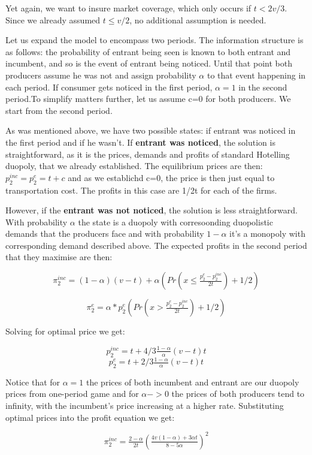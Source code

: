 \documentclass{article}
\begin{document}
Yet again, we want to insure market coverage, which only occurs if $t<2v/3$. Since we already assumed $t \leq v/2$, no additional assumption is needed.

Let us expand the model to encompass two periods. The information structure is as follows: the probability of entrant being seen is known to both entrant and incumbent, and so is the event of entrant being noticed. Until that point both producers assume he was not and assign probability $\alpha$ to that event happening in each period. If consumer gets noticed in the first period, $\alpha =1$ in the second period.To simplify matters further, let us assume c=0 for both producers. We start from the second period.

As was mentioned above, we have two possible states: if entrant was noticed in the first period and if he wasn't. If \textbf{entrant was noticed}, the solution is straightforward, as it is the prices, demands and profits of standard Hotelling duopoly, that we already established. The equilibrium prices are then: $p^{inc}_2 = p^{e}_2 = t+c$ and as we establichd c=0, the price is then just equal to transportation cost. The profits in this case are 1/2t for each of the firms.

However, if the \textbf{entrant was not noticed}, the solution is less straightforward. With probability $\alpha$ the state is a duopoly with corresoonding duopolistic demands that the producers face and with probability $1- \alpha$ it's a monopoly with corresponding demand described above. 
The expected profits in the second period that they maximise are then:

$$ \pi^{inc}_2 = (1-\alpha)(v-t) +  \alpha(Pr(x \leq \tfrac{p^{e}_2 - p^{inc}_2}{2t}) + 1/2)$$

$$ \pi^{e}_2 = \alpha *p_2^{e}(Pr(x > \tfrac{p^{e}_2 - p^{inc}_2}{2t}) + 1/2)
$$

Solving for optimal price we get:

$$
p_2^{inc} = t + 4/3 \tfrac{1-\alpha}{\alpha}(v-t)t$$
$$
p_2^{e} = t + 2/3\tfrac{1-\alpha}{\alpha}(v-t)t
$$

Notice that for $\alpha = 1$ the prices of both incumbent and entrant are our duopoly prices from one-period game and for $\alpha -> 0$ the prices of both producers tend to infinity, with the incumbent's price increasing at a higher rate. 
Substituting optimal prices into the profit equation we get: 

$$ \pi^{inc}_2 = \tfrac{2-\alpha}{2t}(\tfrac{4v(1-\alpha) + 3\alpha t}{8-5\alpha})^2$$
\end{document}
